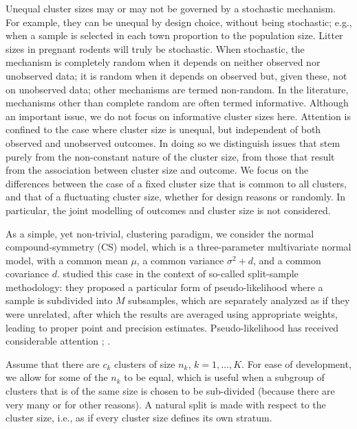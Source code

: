 \documentclass[11pt,a5paper,twoside]{book}
\begin{document}
Unequal cluster sizes may or may not be governed by a stochastic mechanism. For example, they can be unequal by design choice, without being stochastic; e.g., when a sample is selected in each town proportion to the population size. Litter sizes in pregnant rodents will truly be stochastic. When stochastic, the mechanism is completely random when it depends on neither observed nor unobserved data; it is random when it depends on observed but, given these, not on unobserved data; other mechanisms are termed non-random. In the literature, mechanisms other than complete random are often termed informative. Although an important issue, we do not focus on informative cluster sizes here. Attention is confined to the case where cluster size is unequal, but independent of both observed and unobserved outcomes. In doing so we distinguish issues that stem purely from the non-constant nature of the cluster size, from those that result from the association between cluster size and outcome. We focus on the differences between the case of a fixed cluster size that is common to all clusters, and that of a fluctuating cluster size, whether for design reasons or randomly. In particular, the joint modelling of outcomes and cluster size is not considered.

As a simple, yet non-trivial, clustering paradigm, we consider the normal compound-symmetry (CS) model, which is a three-parameter multivariate normal model, with a common mean $\mu$, a common variance $\sigma^2+d$, and a common covariance $d$.  \cite{Iddi2011} studied this case in the context of so-called split-sample methodology: they proposed a particular form of pseudo-likelihood where a sample is subdivided into $M$ subsamples, which are separately analyzed as if they were unrelated, after which the results are averaged using appropriate weights, leading to proper point and precision estimates. 
Pseudo-likelihood has received considerable attention \citep[Ch.~9, 12, 21, 24, 25)]{molenberghs2005}; \citep[Ch.~6, 7]{aerts2002}.



Assume that there are $c_k$ clusters of size $n_k$, $k=1,\dots,K$. For ease of development, we allow for some of the $n_k$ to be equal, which is useful when a subgroup of clusters that is of the same size is chosen to be sub-divided (because there are very many or for other reasons). A natural split is made with respect to the cluster size, i.e., as if every cluster size defines its own stratum. 
\end{document}
